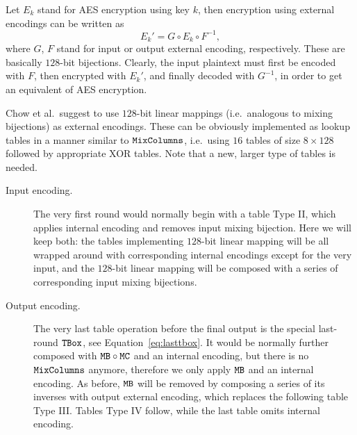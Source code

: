 	Let $E_k$ stand for AES encryption using key $k$, then encryption using external encodings can be written as
	\begin{equation}
	\label{eq:extenc}
		E_k' = G \circ E_k \circ F^{-1} ,
	\end{equation}
	where $G$, $F$ stand for input or output external encoding, respectively. These are basically $128$-bit bijections. Clearly, the input plaintext must first be encoded with $F$, then encrypted with $E_k'$, and finally decoded with $G^{-1}$, in order to get an equivalent of AES encryption.
	
	Chow et al.\ suggest to use $128$-bit linear mappings (i.e.\ analogous to mixing bijections) as external encodings. These can be obviously implemented as lookup tables in a manner similar to $\texttt{MixColumns}$, i.e.\ using $16$ tables of size $8\times 128$ followed by appropriate XOR tables. Note that a new, larger type of tables is needed.
	
	\begin{description}
		\item[Input encoding.] The very first round would normally begin with a table Type II, which applies internal encoding and removes input mixing bijection. Here we will keep both: the tables implementing $128$-bit linear mapping will be all wrapped around with corresponding internal encodings except for the very input, and the $128$-bit linear mapping will be composed with a series of corresponding input mixing bijections.
		\item[Output encoding.] The very last table operation before the final output is the special last-round $\texttt{TBox}$, see Equation~\ref{eq:lasttbox}. It would be normally further composed with $\texttt{MB}\circ\texttt{MC}$ and an internal encoding, but there is no $\texttt{MixColumns}$ anymore, therefore we only apply $\texttt{MB}$ and an internal encoding. As before, $\texttt{MB}$ will be removed by composing a series of its inverses with output external encoding, which replaces the following table Type III. Tables Type IV follow, while the last table omits internal encoding.
	\end{description}
	



